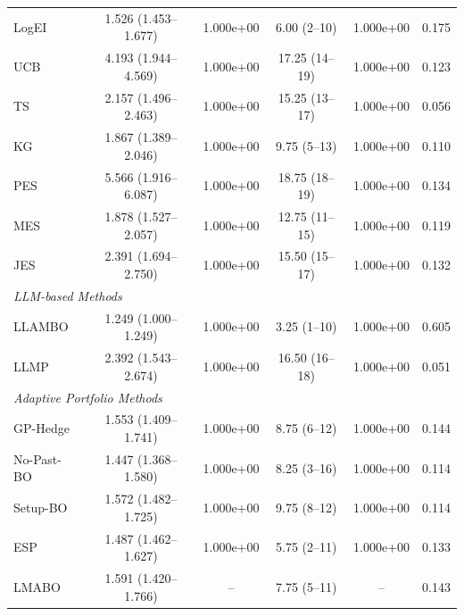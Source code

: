 \begin{table}
\begin{tabular}{@{}lccccc@{}}
LogEI & 1.526 (1.453--1.677) & 1.000e+00 & 6.00 (2--10) & 1.000e+00 & 0.175 \\
UCB & 4.193 (1.944--4.569) & 1.000e+00 & 17.25 (14--19) & 1.000e+00 & 0.123 \\
TS & 2.157 (1.496--2.463) & 1.000e+00 & 15.25 (13--17) & 1.000e+00 & 0.056 \\
KG & 1.867 (1.389--2.046) & 1.000e+00 & 9.75 (5--13) & 1.000e+00 & 0.110 \\
PES & 5.566 (1.916--6.087) & 1.000e+00 & 18.75 (18--19) & 1.000e+00 & 0.134 \\
MES & 1.878 (1.527--2.057) & 1.000e+00 & 12.75 (11--15) & 1.000e+00 & 0.119 \\
JES & 2.391 (1.694--2.750) & 1.000e+00 & 15.50 (15--17) & 1.000e+00 & 0.132 \\
\multicolumn{5}{l}{\textit{LLM-based Methods}} \\
LLAMBO & 1.249 (1.000--1.249) & 1.000e+00 & 3.25 (1--10) & 1.000e+00 & 0.605 \\
LLMP & 2.392 (1.543--2.674) & 1.000e+00 & 16.50 (16--18) & 1.000e+00 & 0.051 \\
\multicolumn{5}{l}{\textit{Adaptive Portfolio Methods}} \\
GP-Hedge & 1.553 (1.409--1.741) & 1.000e+00 & 8.75 (6--12) & 1.000e+00 & 0.144 \\
No-Past-BO & 1.447 (1.368--1.580) & 1.000e+00 & 8.25 (3--16) & 1.000e+00 & 0.114 \\
Setup-BO & 1.572 (1.482--1.725) & 1.000e+00 & 9.75 (8--12) & 1.000e+00 & 0.114 \\
ESP & 1.487 (1.462--1.627) & 1.000e+00 & 5.75 (2--11) & 1.000e+00 & 0.133 \\
\midrule
LMABO & 1.591 (1.420--1.766) & -- & 7.75 (5--11) & -- & 0.143 \\
\bottomrule
    \end{tabular}
    \end{table}
    
